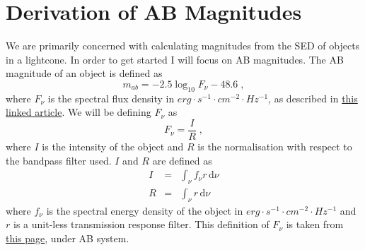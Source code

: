 \documentclass[12pt]{scrartcl}
\newcommand{\dx}[1]{\ensuremath{\,\mathrm{d}#1}}
\begin{document}
\maketitle

\section{Derivation of AB Magnitudes}

We are primarily concerned with calculating magnitudes from the SED
of objects in a lightcone. In order to get started I will focus on AB
magnitudes. The AB magnitude of an object is defined as
\[ m_{ab} = -2.5\log_{10}F_{\nu} - 48.6 \; , \]
where $F_\nu$ is the spectral flux density in $erg\cdot s^{-1}\cdot cm^{-2} \cdot Hz^{-1}$,
as described in \href{http://meghnad.iucaa.ernet.in/~dipankar/ph217/magnitudes.pdf}{this linked article}. We will be defining $F_\nu$ as
\[ F_\nu = \frac{I}{R} \; , \]
where $I$ is the intensity of the object and $R$ is the normalisation
with respect to the bandpass filter used. $I$ and $R$ are defined
as
\begin{eqnarray*}
I & = & \int_\nu f_\nu r \dx{\nu} \\
R & = & \int_\nu r \dx{\nu}
\end{eqnarray*}
where $f_\nu$ is the spectral energy density of the object in
$erg\cdot s^{-1}\cdot cm^{-2}\cdot Hz^{-1}$ and $r$ is a unit-less transmission
response filter. This definition of $F_\nu$ is taken from \href{http://dls.physics.ucdavis.edu/calib/vegaab.html}{this page}, under AB system.
\end{document}
